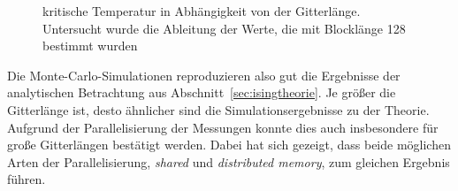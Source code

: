 	\begin{figure}[htbp]
		
		\caption[kritische Temperatur in Abhängigkeit von der Gitterlänge]{kritische Temperatur in Abhängigkeit von der Gitterlänge. Untersucht wurde die Ableitung der Werte, die mit Blocklänge 128 bestimmt wurden}
		\label{fig:tkritlaenge}
	\end{figure}

	
	\newpage

	Die Monte-Carlo-Simulationen reproduzieren also gut die Ergebnisse der analytischen Betrachtung aus Abschnitt~\ref{sec:isingtheorie}. Je größer die Gitterlänge ist, desto ähnlicher sind die Simulationsergebnisse zu der Theorie. Aufgrund der Parallelisierung der Messungen konnte dies auch insbesondere für große Gitterlängen bestätigt werden. Dabei hat sich gezeigt, dass beide möglichen Arten der Parallelisierung, \textit{shared} und \textit{distributed memory}, zum gleichen Ergebnis führen.
	
	
%	
%			
%			
%			
	
